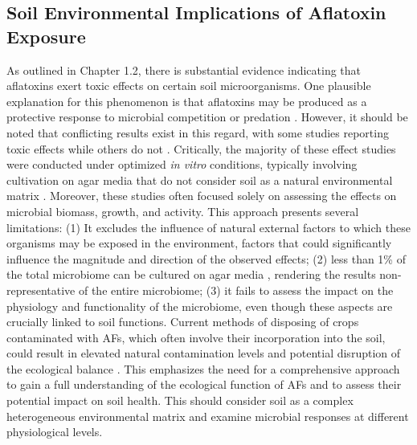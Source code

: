 \subsection{Soil Environmental Implications of Aflatoxin Exposure}

As outlined in Chapter 1.2, there is substantial evidence indicating that aflatoxins exert toxic effects on certain soil microorganisms. One plausible explanation for this phenomenon is that aflatoxins may be produced as a protective response to microbial competition or predation \citep{elmholt2008mycotoxins}. However, it should be noted that conflicting results exist in this regard, with some studies reporting toxic effects while others do not \citep{burmeister1966survey, arai1967antimicrobial, angle1981aflatoxin}. Critically, the majority of these effect studies were conducted under optimized \textit{in vitro} conditions, typically involving cultivation on agar media that do not consider soil as a natural environmental matrix \citep{drott2019fitness}. Moreover, these studies often focused solely on assessing the effects on microbial biomass, growth, and activity. This approach presents several limitations: (1) It excludes the influence of natural external factors to which these organisms may be exposed in the environment, factors that could significantly influence the magnitude and direction of the observed effects; (2) less than 1\% of the total microbiome can be cultured on agar media \citep{pham2012cultivation}, rendering the results non-representative of the entire microbiome; (3) it fails to assess the impact on the physiology and functionality of the microbiome, even though these aspects are crucially linked to soil functions. Current methods of disposing of crops contaminated with AFs, which often involve their incorporation into the soil, could result in elevated natural contamination levels and potential disruption of the ecological balance \citep{fouche2020aflatoxins}. This emphasizes the need for a comprehensive approach to gain a full understanding of the ecological function of AFs and to assess their potential impact on soil health. This should consider soil as a complex heterogeneous environmental matrix and examine microbial responses at different physiological levels.


